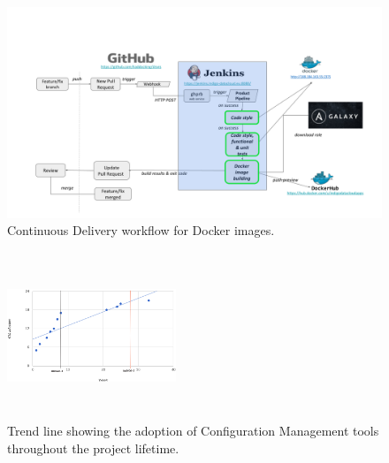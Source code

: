 \documentclass[journal]{IEEEtran}
\begin{document}
\begin{figure}[ht]
\centering
\includegraphics[width=\textwidth]{images/devops.png}
\caption{Continuous Delivery workflow for Docker images.}
\label{fig:fig_CD}
\end{figure}


\begin{figure}[ht]
\centering
\includegraphics[width=0.45\textwidth, height=50mm]{images/confman.png}
\caption{Trend line showing the adoption of Configuration Management tools throughout the project lifetime.}
\label{fig:fig_confman}
\end{figure}
\end{document}
